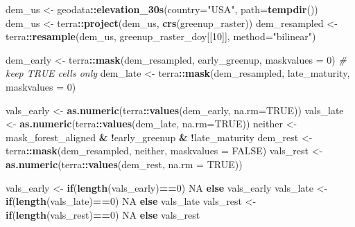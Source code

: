 \documentclass[
]{article}
\newenvironment{Shaded}{\begin{snugshade}}{\end{snugshade}}
\newcommand{\AttributeTok}[1]{\textcolor[rgb]{0.13,0.29,0.53}{#1}}
\newcommand{\CommentTok}[1]{\textcolor[rgb]{0.56,0.35,0.01}{\textit{#1}}}
\newcommand{\ConstantTok}[1]{\textcolor[rgb]{0.56,0.35,0.01}{#1}}
\newcommand{\ControlFlowTok}[1]{\textcolor[rgb]{0.13,0.29,0.53}{\textbf{#1}}}
\newcommand{\DecValTok}[1]{\textcolor[rgb]{0.00,0.00,0.81}{#1}}
\newcommand{\FunctionTok}[1]{\textcolor[rgb]{0.13,0.29,0.53}{\textbf{#1}}}
\newcommand{\NormalTok}[1]{#1}
\newcommand{\OtherTok}[1]{\textcolor[rgb]{0.56,0.35,0.01}{#1}}
\newcommand{\SpecialCharTok}[1]{\textcolor[rgb]{0.81,0.36,0.00}{\textbf{#1}}}
\newcommand{\StringTok}[1]{\textcolor[rgb]{0.31,0.60,0.02}{#1}}
\begin{document}
\begin{Shaded}
\begin{Highlighting}[]
\NormalTok{dem\_us }\OtherTok{\textless{}{-}}\NormalTok{ geodata}\SpecialCharTok{::}\FunctionTok{elevation\_30s}\NormalTok{(}\AttributeTok{country=}\StringTok{"USA"}\NormalTok{, }\AttributeTok{path=}\FunctionTok{tempdir}\NormalTok{())}
\NormalTok{dem\_us }\OtherTok{\textless{}{-}}\NormalTok{ terra}\SpecialCharTok{::}\FunctionTok{project}\NormalTok{(dem\_us, }\FunctionTok{crs}\NormalTok{(greenup\_raster))}
\NormalTok{dem\_resampled }\OtherTok{\textless{}{-}}\NormalTok{ terra}\SpecialCharTok{::}\FunctionTok{resample}\NormalTok{(dem\_us, greenup\_raster\_doy[[}\DecValTok{10}\NormalTok{]], }\AttributeTok{method=}\StringTok{"bilinear"}\NormalTok{)}

\NormalTok{dem\_early }\OtherTok{\textless{}{-}}\NormalTok{ terra}\SpecialCharTok{::}\FunctionTok{mask}\NormalTok{(dem\_resampled, early\_greenup, }\AttributeTok{maskvalues =} \DecValTok{0}\NormalTok{)  }\CommentTok{\# keep TRUE cells only}
\NormalTok{dem\_late  }\OtherTok{\textless{}{-}}\NormalTok{ terra}\SpecialCharTok{::}\FunctionTok{mask}\NormalTok{(dem\_resampled, late\_maturity,  }\AttributeTok{maskvalues =} \DecValTok{0}\NormalTok{)}

\NormalTok{vals\_early }\OtherTok{\textless{}{-}} \FunctionTok{as.numeric}\NormalTok{(terra}\SpecialCharTok{::}\FunctionTok{values}\NormalTok{(dem\_early, }\AttributeTok{na.rm=}\ConstantTok{TRUE}\NormalTok{))}
\NormalTok{vals\_late  }\OtherTok{\textless{}{-}} \FunctionTok{as.numeric}\NormalTok{(terra}\SpecialCharTok{::}\FunctionTok{values}\NormalTok{(dem\_late, }\AttributeTok{na.rm=}\ConstantTok{TRUE}\NormalTok{))}
\NormalTok{neither }\OtherTok{\textless{}{-}}\NormalTok{ mask\_forest\_aligned }\SpecialCharTok{\&} \SpecialCharTok{!}\NormalTok{early\_greenup }\SpecialCharTok{\&} \SpecialCharTok{!}\NormalTok{late\_maturity}
\NormalTok{dem\_rest }\OtherTok{\textless{}{-}}\NormalTok{ terra}\SpecialCharTok{::}\FunctionTok{mask}\NormalTok{(dem\_resampled, neither, }\AttributeTok{maskvalues =} \ConstantTok{FALSE}\NormalTok{)}
\NormalTok{vals\_rest }\OtherTok{\textless{}{-}} \FunctionTok{as.numeric}\NormalTok{(terra}\SpecialCharTok{::}\FunctionTok{values}\NormalTok{(dem\_rest, }\AttributeTok{na.rm =} \ConstantTok{TRUE}\NormalTok{))}

\NormalTok{vals\_early }\OtherTok{\textless{}{-}} \ControlFlowTok{if}\NormalTok{(}\FunctionTok{length}\NormalTok{(vals\_early)}\SpecialCharTok{==}\DecValTok{0}\NormalTok{) }\ConstantTok{NA} \ControlFlowTok{else}\NormalTok{ vals\_early}
\NormalTok{vals\_late  }\OtherTok{\textless{}{-}} \ControlFlowTok{if}\NormalTok{(}\FunctionTok{length}\NormalTok{(vals\_late)}\SpecialCharTok{==}\DecValTok{0}\NormalTok{) }\ConstantTok{NA} \ControlFlowTok{else}\NormalTok{ vals\_late}
\NormalTok{vals\_rest  }\OtherTok{\textless{}{-}} \ControlFlowTok{if}\NormalTok{(}\FunctionTok{length}\NormalTok{(vals\_rest)}\SpecialCharTok{==}\DecValTok{0}\NormalTok{) }\ConstantTok{NA} \ControlFlowTok{else}\NormalTok{ vals\_rest}


\end{Highlighting}
\end{Shaded}
\end{document}
